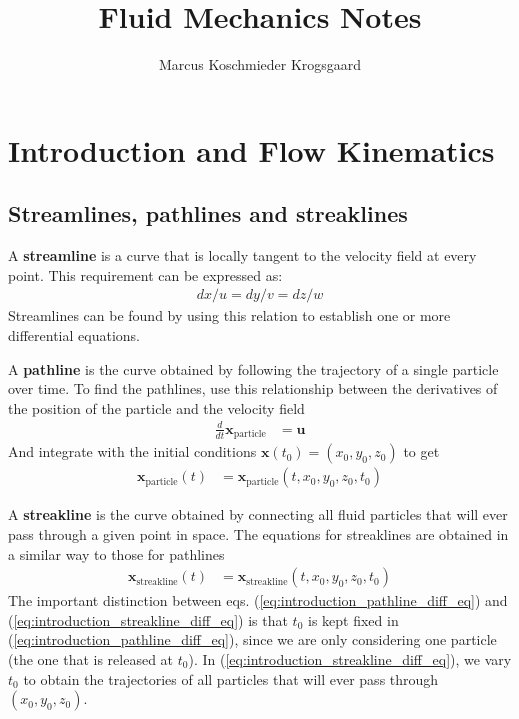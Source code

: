 \documentclass[a4paper, 12pt]{article}
\title{Fluid Mechanics Notes}
\author{Marcus Koschmieder Krogsgaard}
\numberwithin{equation}{subsubsection}
\begin{document}
\maketitle

\tableofcontents

\newpage
\section{Introduction and Flow Kinematics}
\subsection{Streamlines, pathlines and streaklines}

A \textbf{streamline} is a curve that is locally tangent to the velocity field at every point. This requirement can be expressed as:
\begin{align}
	dx/u = dy/v = dz/w \label{eq:introduction_steamline_eq}
\end{align}
Streamlines can be found by using this relation to establish one or more differential equations.

A \textbf{pathline} is the curve obtained by following the trajectory of a single particle over time. To find the pathlines, use this relationship between the derivatives of the position of the particle and the velocity field
\begin{align}
	\frac{d}{dt} \mathbf{x}_\text{particle} &= \mathbf{u}
\end{align}
And integrate with the initial conditions $\mathbf{x}(t_0) = (x_0, y_0, z_0)$ to get
\begin{align}
	\mathbf{x}_\text{particle}(t) &= \mathbf{x}_\text{particle}(t, x_0, y_0, z_0, t_0) \label{eq:introduction_pathline_diff_eq}
\end{align}

A \textbf{streakline} is the curve obtained by connecting all fluid particles that will ever pass through a given point in space. The equations for streaklines are obtained in a similar way to those for pathlines
\begin{align}
	\mathbf{x}_\text{streakline}(t) &= \mathbf{x}_\text{streakline}(t, x_0, y_0, z_0, t_0) \label{eq:introduction_streakline_diff_eq}
\end{align}
The important distinction between eqs. (\ref{eq:introduction_pathline_diff_eq}) and (\ref{eq:introduction_streakline_diff_eq}) is that $t_0$ is kept fixed in (\ref{eq:introduction_pathline_diff_eq}), since we are only considering one particle (the one that is released at $t_0$). In (\ref{eq:introduction_streakline_diff_eq}), we vary $t_0$ to obtain the trajectories of all particles that will ever pass through $(x_0, y_0, z_0)$.
\end{document}
